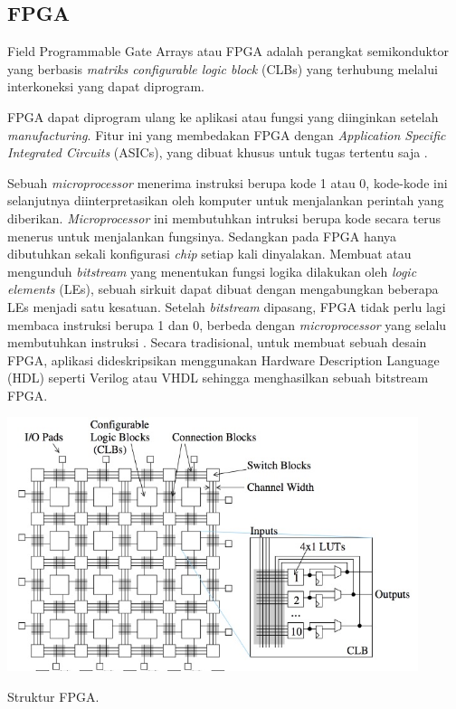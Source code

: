 \subsection{FPGA}
Field Programmable Gate Arrays atau FPGA adalah perangkat semikonduktor yang berbasis \textit{matriks configurable logic block} (CLBs) yang terhubung melalui interkoneksi yang dapat diprogram.

FPGA dapat diprogram ulang ke aplikasi atau fungsi yang diinginkan setelah \textit{manufacturing}. Fitur ini yang membedakan FPGA dengan \textit{Application Specific Integrated Circuits} (ASICs), yang dibuat khusus untuk tugas tertentu saja .

Sebuah \textit{microprocessor} menerima instruksi berupa kode 1 atau 0, kode-kode ini selanjutnya diinterpretasikan oleh komputer untuk menjalankan perintah yang diberikan. \textit{Microprocessor} ini membutuhkan intruksi berupa kode secara terus menerus untuk menjalankan fungsinya. Sedangkan pada FPGA hanya dibutuhkan sekali konfigurasi \textit{chip} setiap kali dinyalakan. Membuat atau mengunduh \textit{bitstream} yang menentukan fungsi logika dilakukan oleh \textit{logic elements} (LEs), sebuah sirkuit dapat dibuat dengan mengabungkan beberapa LEs menjadi satu kesatuan. Setelah \textit{bitstream} dipasang, FPGA tidak perlu lagi membaca instruksi berupa 1 dan 0, berbeda dengan \textit{microprocessor} yang selalu membutuhkan instruksi . Secara tradisional, untuk membuat sebuah desain FPGA, aplikasi dideskripsikan menggunakan Hardware Description Language (HDL) seperti Verilog atau VHDL sehingga menghasilkan sebuah bitstream FPGA.

\begin{afigure}
    \includegraphics[width=12cm, center]{images/fpga-structure.jpeg}
    \caption{Struktur FPGA.}
    \label{fig:fpga-structure}
\end{afigure}

